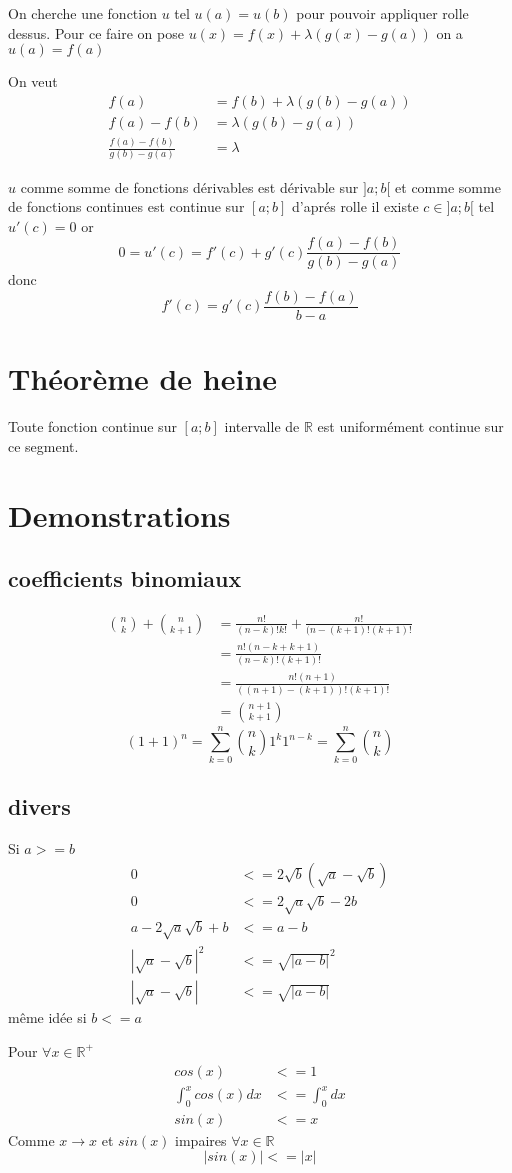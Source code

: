 \documentclass[a4paper,10pt]{article}
\begin{document}
On cherche une fonction $u$ tel $u(a) = u(b)$ pour pouvoir appliquer rolle dessus. Pour ce faire on pose
$u(x) = f(x) + \lambda (g(x) - g(a))$
on a $u(a) = f(a)$


On veut
\begin{align*}
f(a) &= f(b) + \lambda(g(b) - g(a))\\
f(a) - f(b) &= \lambda(g(b) - g(a))\\
\frac{f(a) - f(b)}{g(b) - g(a)} &= \lambda
\end{align*}

$u$ comme somme de fonctions dérivables est dérivable sur $]a;b[$ et comme somme de fonctions continues est continue sur $[a;b]$
d'aprés rolle il existe $c \in ]a;b[$ tel $u'(c) = 0$ or
\[0 = u'(c) = f'(c) + g'(c)\frac{f(a) - f(b)}{g(b) - g(a)}\]
donc \[f'(c) = g'(c)\frac{f(b) - f(a)}{b - a}\]







\section{Théorème de heine}
Toute fonction continue sur $[a;b]$ intervalle de $\mathbb{R}$ est uniformément continue sur ce segment.

\appendix
\section{Demonstrations}
\subsection{coefficients binomiaux}
\begin{align*}
 \textstyle{n \choose k} + \textstyle{n \choose k + 1} &= \frac{n!}{(n - k)!k!} + \frac{n!}{(n - (k + 1)!(k + 1)!}\\
 &= \frac{n!(n - k + k + 1)}{(n - k)!(k + 1)!}\\
 &= \frac{n!(n + 1)}{((n + 1) - (k + 1))!(k + 1)!}\\
 &= \textstyle{n + 1 \choose k + 1}
\end{align*}
\[(1 + 1)^{n} = \sum_{k = 0}^{n} \textstyle{n \choose k} 1^{k}1^{n - k} = \sum_{k = 0}^{n} \textstyle{n \choose k}\]
\subsection{divers}
Si $a >= b$
\begin{align*}
 0 &<= 2\sqrt{b}(\sqrt{a} - \sqrt{b})\\
 0 &<= 2\sqrt{a}\sqrt{b} -2b\\
 a - 2\sqrt{a}\sqrt{b} + b &<=  a - b\\
 |\sqrt{a} - \sqrt{b}|^{2} &<= \sqrt{|a - b|}^2\\
 |\sqrt{a} - \sqrt{b}| &<= \sqrt{|a - b|}
\end{align*}
même idée si $b <= a$


Pour $\forall x \in \mathbb{R}^{+}$
\begin{align*}
 cos(x) &<= 1\\
 \int_{0}^{x} cos(x) dx&<= \int_{0}^{x} dx\\
 sin(x) &<= x
\end{align*}
Comme $x \longrightarrow x$ et $sin(x)$ impaires $\forall x \in \mathbb{R}$ 
\[|sin(x)| <= |x|\]
\end{document}
